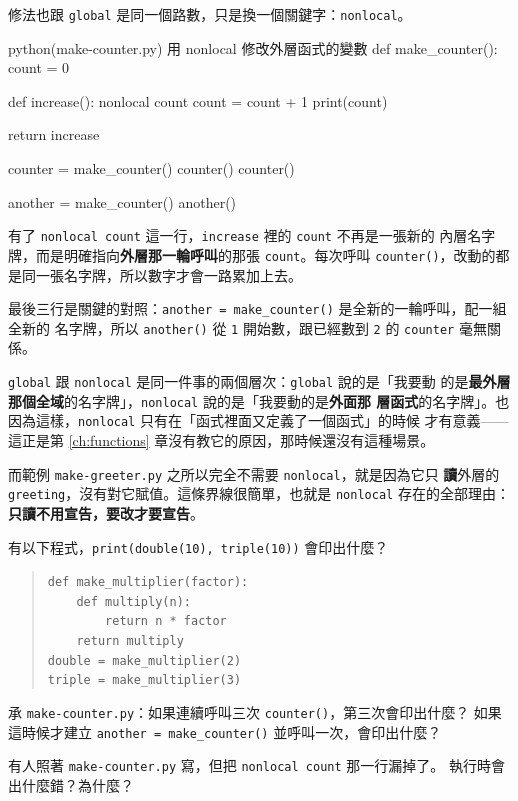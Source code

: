 修法也跟 \texttt{global} 是同一個路數，只是換一個關鍵字：\texttt{nonlocal}。

\begin{example}{python}{(make-counter.py) 用 nonlocal 修改外層函式的變數}
def make_counter():
    count = 0

    def increase():
        nonlocal count
        count = count + 1
        print(count)

    return increase


counter = make_counter()
counter()
counter()

another = make_counter()
another()
\end{example}


有了 \texttt{nonlocal count} 這一行，\texttt{increase} 裡的 \texttt{count} 不再是一張新的
內層名字牌，而是明確指向\textbf{外層那一輪呼叫}的那張 \texttt{count}。每次呼叫
\texttt{counter()}，改動的都是同一張名字牌，所以數字才會一路累加上去。

最後三行是關鍵的對照：\texttt{another = make\_counter()} 是全新的一輪呼叫，配一組全新的
名字牌，所以 \texttt{another()} 從 \texttt{1} 開始數，跟已經數到 \texttt{2} 的
\texttt{counter} 毫無關係。

\texttt{global} 跟 \texttt{nonlocal} 是同一件事的兩個層次：\texttt{global} 說的是「我要動
的是\textbf{最外層那個全域}的名字牌」，\texttt{nonlocal} 說的是「我要動的是\textbf{外面那
層函式}的名字牌」。也因為這樣，\texttt{nonlocal} 只有在「函式裡面又定義了一個函式」的時候
才有意義——這正是第 \ref{ch:functions} 章沒有教它的原因，那時候還沒有這種場景。

而範例 \texttt{make-greeter.py} 之所以完全不需要 \texttt{nonlocal}，就是因為它只
\textbf{讀}外層的 \texttt{greeting}，沒有對它賦值。這條界線很簡單，也就是 \texttt{nonlocal}
存在的全部理由：\textbf{只讀不用宣告，要改才要宣告}。

\begin{drills}[label=drills:closure]
\item 有以下程式，\texttt{print(double(10), triple(10))} 會印出什麼？
\begin{quote}
\texttt{def make\_multiplier(factor):} \\
\texttt{~~~~def multiply(n):} \\
\texttt{~~~~~~~~return n * factor} \\
\texttt{~~~~return multiply} \\
\texttt{double = make\_multiplier(2)} \\
\texttt{triple = make\_multiplier(3)}
\end{quote}
\item 承 \texttt{make-counter.py}：如果連續呼叫三次 \texttt{counter()}，第三次會印出什麼？
如果這時候才建立 \texttt{another = make\_counter()} 並呼叫一次，會印出什麼？
\item 有人照著 \texttt{make-counter.py} 寫，但把 \texttt{nonlocal count} 那一行漏掉了。
執行時會出什麼錯？為什麼？
\end{drills}

